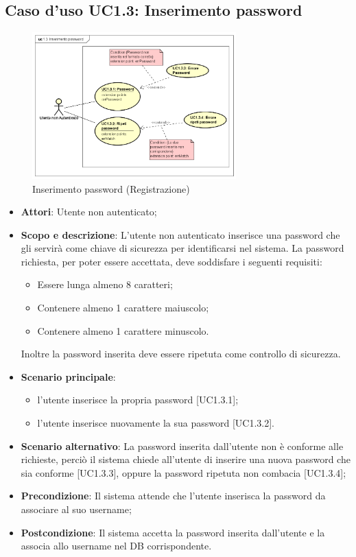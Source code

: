 \documentclass[12pt,a4paper,titlepage]{article}
\begin{document}
	\subsection{Caso d'uso UC1.3: Inserimento password}
	\label{UC1.3}
	\begin{figure}[H]
		\centering
		\includegraphics[width=0.7\textwidth]{UseCase/InserimentoPassword}
		\caption{Inserimento password (Registrazione)}
	\end{figure}
	\begin{itemize}
		\item \textbf{Attori}: Utente non autenticato;
		\item \textbf{Scopo e descrizione}: L'utente non autenticato inserisce una password che gli servirà come chiave di sicurezza per identificarsi nel sistema. La password richiesta, per poter essere accettata, deve soddisfare i seguenti requisiti: 
		\begin{itemize}
			\item Essere lunga almeno 8 caratteri; 
			\item Contenere almeno 1 carattere maiuscolo; 
			\item Contenere almeno 1 carattere minuscolo.
		\end{itemize}
		Inoltre la password inserita deve essere ripetuta come controllo di sicurezza.
		\item \textbf{Scenario principale}:
		\begin{itemize}
			\item l'utente inserisce la propria password [UC1.3.1];
			\item l'utente inserisce nuovamente la sua password [UC1.3.2].
		\end{itemize}
		\item \textbf{Scenario alternativo}: La password inserita dall'utente non è conforme alle richieste, perciò il sistema chiede all'utente di inserire una nuova password che sia conforme [UC1.3.3], oppure la password ripetuta non combacia [UC1.3.4];
		\item \textbf{Precondizione}: Il sistema attende che l'utente inserisca la password da associare al suo username;
		\item \textbf{Postcondizione}: Il sistema accetta la password inserita dall'utente e la associa allo username nel DB corrispondente.
	\end{itemize}
\end{document}
